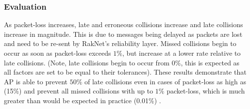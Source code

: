 %

\subsubsection{Evaluation}
As packet-loss increases, late and erroneous collisions increase and late collisions increase in magnitude. This is due to messages being delayed as packets are lost and need to be re-sent by RakNet's reliability layer. Missed collisions begin to occur as soon as packet-loss exceeds $1\%$, but increase at a lower rate relative to late collisions. (Note, late collisions begin to occur from $0\%$, this is expected as all factors are set to be equal to their tolerances). These results demonstrate that AP is able to prevent $50\%$ of late collisions even in cases of packet-loss as high as (15\%) and prevent all missed collisions with up to $1\%$ packet-loss, which is much greater than would be expected in practice (0.01\%) \cite{ThousandEyesCloudPerf2018}.

